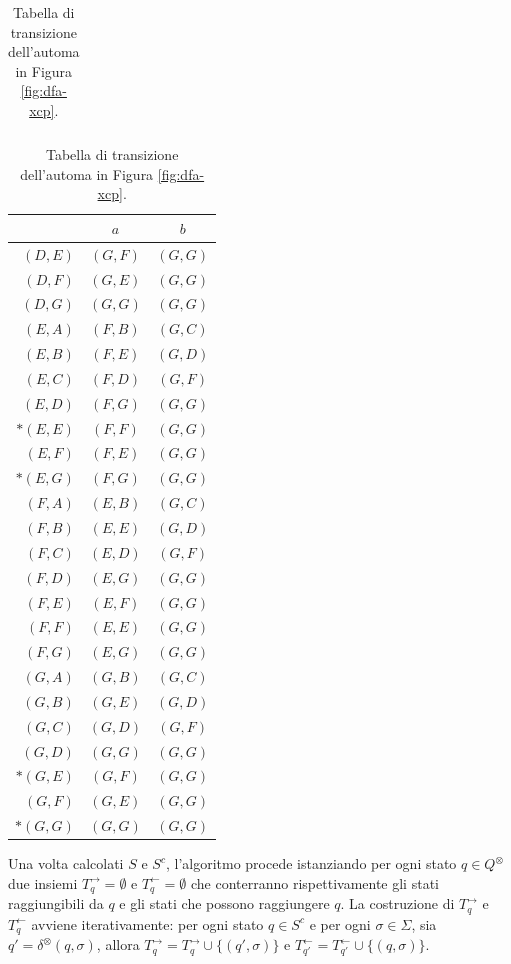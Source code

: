 \documentclass[a4paper,12pt]{report} %
\begin{document}
\begin{table}[!htb]
\begin{tabular}[t]{r|c|c}
  \end{tabular}
  \quad
  \begin{tabular}[t]{r|c|c}
    \toprule
              & $a$       & $b$       \\
    \midrule
    $(D, E)$  & $(G, F)$  & $(G, G)$  \\
    $(D, F)$  & $(G, E)$  & $(G, G)$  \\
    $(D, G)$  & $(G, G)$  & $(G, G)$  \\
    $(E, A)$  & $(F, B)$  & $(G, C)$  \\
    $(E, B)$  & $(F, E)$  & $(G, D)$  \\
    $(E, C)$  & $(F, D)$  & $(G, F)$  \\
    $(E, D)$  & $(F, G)$  & $(G, G)$  \\
    $*(E, E)$ & $(F, F)$  & $(G, G)$  \\
    $(E, F)$  & $(F, E)$  & $(G, G)$  \\
    $*(E, G)$ & $(F, G)$  & $(G, G)$  \\
    $(F, A)$  & $(E, B)$  & $(G, C)$  \\
    $(F, B)$  & $(E, E)$  & $(G, D)$  \\
    $(F, C)$  & $(E, D)$  & $(G, F)$  \\
    $(F, D)$  & $(E, G)$  & $(G, G)$  \\
    $(F, E)$  & $(E, F)$  & $(G, G)$  \\
    $(F, F)$  & $(E, E)$  & $(G, G)$  \\
    $(F, G)$  & $(E, G)$  & $(G, G)$  \\
    $(G, A)$  & $(G, B)$  & $(G, C)$  \\
    $(G, B)$  & $(G, E)$  & $(G, D)$  \\
    $(G, C)$  & $(G, D)$  & $(G, F)$  \\
    $(G, D)$  & $(G, G)$  & $(G, G)$  \\
    $*(G, E)$ & $(G, F)$  & $(G, G)$  \\
    $(G, F)$  & $(G, E)$  & $(G, G)$  \\
    $*(G, G)$ & $(G, G)$  & $(G, G)$  \\
    \bottomrule
  \end{tabular}
  \caption{\label{tab:dfa-xcp-transitions}Tabella di transizione dell'automa in Figura \ref{fig:dfa-xcp}.}
\end{table}

Una volta calcolati $S$ e $S^c$, l'algoritmo procede istanziando per ogni stato $q \in Q^\otimes$ due insiemi
$T^\rightarrow_q = \emptyset$ e $T^\leftarrow_q = \emptyset$ che conterranno rispettivamente gli stati raggiungibili
da $q$ e gli stati che possono raggiungere $q$. La costruzione di $T^\rightarrow_q$ e $T^\leftarrow_q$ avviene
iterativamente: per ogni stato $q \in S^c$ e per ogni $\sigma \in \Sigma$, sia $q' = \delta^\otimes(q, \sigma)$,
allora $T^\rightarrow_q = T^\rightarrow_q \cup \{ (q', \sigma) \}$ e 
$T^\leftarrow_{q'} = T^\leftarrow_{q'} \cup \{ (q, \sigma) \}$.
\end{document}
